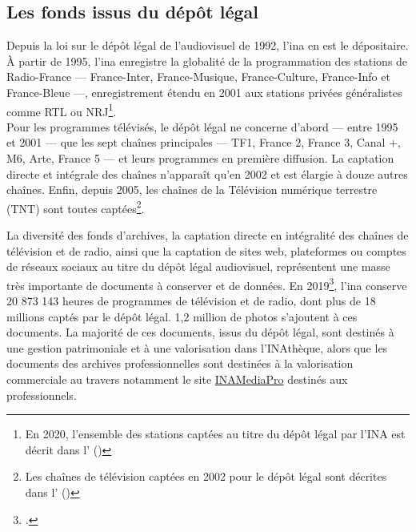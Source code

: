 \subsection{\label{I-B-1-b}Les fonds issus du dépôt légal}

Depuis la loi sur le dépôt légal de l'audiovisuel de 1992, l'\ac{ina} en est le dépositaire. À partir de 1995, l'\ac{ina} enregistre la globalité de la programmation des stations de Radio-France --- France-Inter, France-Musique, France-Culture, France-Info et France-Bleue ---, enregistrement étendu en 2001 aux stations privées généralistes comme RTL ou NRJ\footnote{En 2020, l'ensemble des stations captées au titre du dépôt légal par l'INA est décrit dans l' ()}.\\

Pour les programmes télévisés, le dépôt légal ne concerne d'abord --- entre 1995 et 2001 --- que les sept chaînes principales --- TF1, France 2, France 3, Canal +, M6, Arte, France 5 --- et leurs programmes en première diffusion. La captation directe et intégrale des chaînes n'apparaît qu'en 2002 et est élargie à douze autres chaînes. Enfin, depuis 2005, les chaînes de la Télévision numérique terrestre (TNT) sont toutes captées\footnote{Les chaînes de télévision captées en 2002 pour le dépôt légal sont décrites dans l' ()}.

\bigskip
\bigskip

La diversité des fonds d'archives, la captation directe en intégralité des chaînes de télévision et de radio, ainsi que la captation de sites web, plateformes ou comptes de réseaux sociaux au titre du dépôt légal audiovisuel, représentent une masse très importante de documents à conserver et de données. En 2019\footcite[p.5]{institut_national_de_laudiovisuel_rapport_2019}, l'\ac{ina} conserve 20 873 143 heures de programmes de télévision et de radio, dont plus de 18 millions captés par le dépôt légal. 1,2 million de photos s'ajoutent à ces documents. La majorité de ces documents, issus du dépôt légal, sont destinés à une gestion patrimoniale et à une valorisation dans l'INAthèque, alors que les documents des archives professionnelles sont destinées à la valorisation commerciale au travers notamment le site \href{https://www.inamediapro.com}{INAMediaPro} destinés aux professionnels.